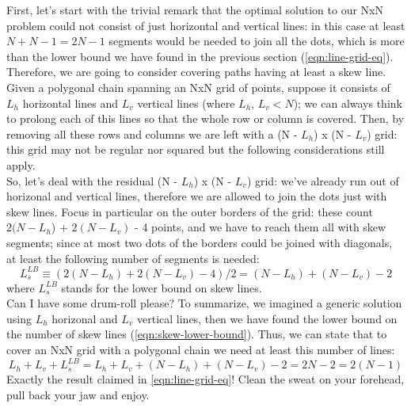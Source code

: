 \documentclass[11pt]{article}
\begin{document}
First, let's start with the trivial remark that the optimal solution to our NxN problem could not consist of just horizontal and vertical lines: in this case at least $N + N - 1 = 2N - 1$ segments would be needed to join all the dots, which is more than the lower bound we have found in the previous section (\autoref{eqn:line-grid-eq}). Therefore, we are going to consider covering paths having at least a skew line.\\
Given a polygonal chain spanning an NxN grid of points, suppose it consists of $L_{h}$ horizontal lines and $L_{v}$ vertical lines (where $L_{h}$, $L_{v} < N$); we can always think to prolong each of this lines so that the whole row or column is covered. Then, by removing all these rows and columns we are left with a (N - $L_{h}$) x (N - $L_{v}$) grid: this grid may not be regular nor squared but the following considerations still apply.\\
So, let's deal with the residual (N - $L_{h}$) x (N - $L_{v}$) grid: we've already run out of horizonal and vertical lines, therefore we are allowed to join the dots just with skew lines. Focus in particular on the outer borders of the grid: these count $2(N-L_{h}$) + $2(N - L_{v})$ - 4 points, and we have to reach them all with skew segments; since at most two dots of the borders could be joined with diagonals, at least the following number of segments is needed:
\begin{equation}
L_{s}^{LB} \equiv (2(N-L_{h}) + 2(N - L_{v}) - 4) / 2 = (N- L_{h}) + (N - L_{v}) - 2
\label{eqn:skew-lower-bound}
\end{equation}
where $L_{s}^{LB}$ stands for the lower bound on skew lines.\\
Can I have some drum-roll please? To summarize, we imagined a generic solution using $L_{h}$ horizonal and $L_{v}$ vertical lines, then we have found the lower bound on the number of skew lines (\autoref{eqn:skew-lower-bound}). Thus, we can state that to cover an NxN grid with a polygonal chain we need at least this number of lines:
\begin{equation}
L_{h} + L_{v} + L_{s}^{LB} = L_{h} + L_{v} + (N - L_{h}) + (N - L_{v}) - 2 = 2N - 2 = 2(N-1)
\label{eqn:lower-bound-grid}
\end{equation}
Exactly the result claimed in \autoref{eqn:line-grid-eq}! Clean the sweat on your forehead, pull back your jaw and enjoy. 
\end{document}
